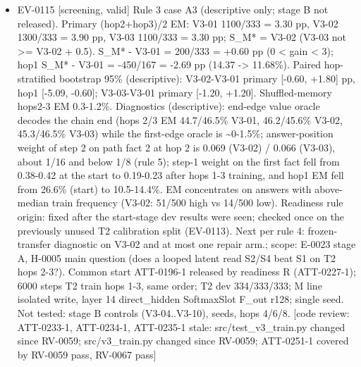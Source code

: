 \documentclass[11pt]{article}
\begin{document}
\begin{itemize}
\item EV-0115 [screening, valid] Rule 3 case A3 (descriptive only; stage B not released). Primary (hop2+hop3)/2 EM: V3-01 1100/333 = 3.30 pp, V3-02 1300/333 = 3.90 pp, V3-03 1100/333 = 3.30 pp; S\_M* = V3-02 (V3-03 not \textgreater{}= V3-02 + 0.5). S\_M* - V3-01 = 200/333 = +0.60 pp (0 \textless{} gain \textless{} 3); hop1 S\_M* - V3-01 = -450/167 = -2.69 pp (14.37 -\textgreater{} 11.68\%). Paired hop-stratified bootstrap 95\% (descriptive): V3-02-V3-01 primary [-0.60, +1.80] pp, hop1 [-5.09, -0.60]; V3-03-V3-01 primary [-1.20, +1.20]. Shuffled-memory hops2-3 EM 0.3-1.2\%. Diagnostics (descriptive): end-edge value oracle decodes the chain end (hops 2/3 EM 44.7/46.5\% V3-01, 46.2/45.6\% V3-02, 45.3/46.5\% V3-03) while the first-edge oracle is \textasciitilde{}0-1.5\%; answer-position weight of step 2 on path fact 2 at hop 2 is 0.069 (V3-02) / 0.066 (V3-03), about 1/16 and below 1/8 (rule 5); step-1 weight on the first fact fell from 0.38-0.42 at the start to 0.19-0.23 after hops 1-3 training, and hop1 EM fell from 26.6\% (start) to 10.5-14.4\%. EM concentrates on answers with above-median train frequency (V3-02: 51/500 high vs 14/500 low). Readiness rule origin: fixed after the start-stage dev results were seen; checked once on the previously unused T2 calibration split (EV-0113). Next per rule 4: frozen-transfer diagnostic on V3-02 and at most one repair arm.; scope: E-0023 stage A, H-0005 main question (does a looped latent read S2/S4 beat S1 on T2 hops 2-3?). Common start ATT-0196-1 released by readiness R (ATT-0227-1); 6000 steps T2 train hops 1-3, same order; T2 dev 334/333/333; M line isolated write, layer 14 direct\_hidden SoftmaxSlot F\_out r128; single seed. Not tested: stage B controls (V3-04..V3-10), seeds, hops 4/6/8. [code review: ATT-0233-1, ATT-0234-1, ATT-0235-1 stale: src/test\_v3\_train.py changed since RV-0059; src/v3\_train.py changed since RV-0059; ATT-0251-1 covered by RV-0059 pass, RV-0067 pass]

\end{itemize}
\end{document}
